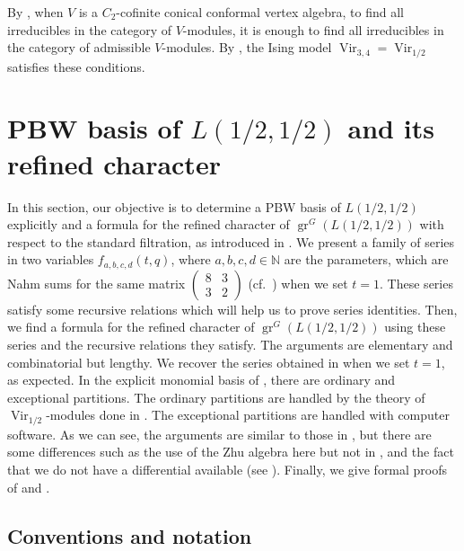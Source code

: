 \documentclass[a4paper, 12pt, reqno]{amsart}
\theoremstyle{remark}
\DeclareMathOperator{\Vir}{Vir}
\DeclareMathOperator{\gr}{gr}
\begin{document}
By , when $V$ is a $C_2$-cofinite conical conformal vertex algebra, to find all irreducibles in the category of $V$-modules, it is enough to find all irreducibles in the category of admissible $V$-modules.
By , the Ising model $\Vir_{3, 4} = \Vir_{1/2}$ satisfies these conditions.

\section{PBW basis of $L(1/2, 1/2)$ and its refined character}
\label{sec:pbw-basis-l12}

In this section, our objective is to determine a PBW basis of $L(1/2, 1/2)$ explicitly and a formula for the refined character of $\gr^G(L(1/2, 1/2))$ with respect to the standard filtration, as introduced in .
We present a family of series in two variables $f_{a, b, c, d}(t, q)$, where $a, b, c, d \in \mathbb{N}$ are the parameters, which are Nahm sums for the same matrix $\left(\begin{smallmatrix} 8 & 3 \\ 3 & 2 \end{smallmatrix}\right)$ (cf.\ \cite{Nahm2007}) when we set $t = 1$.
These series satisfy some recursive relations which will help us to prove series identities.
Then, we find a formula for the refined character of $\gr^G(L(1/2, 1/2))$ using these series and the recursive relations they satisfy.
The arguments are elementary and combinatorial but lengthy.
We recover the series obtained in \cite[Theorem 4]{andrews_singular_2022} when we set $t = 1$, as expected.
In the explicit monomial basis of , there are ordinary and exceptional partitions.
The ordinary partitions are handled by the theory of $\Vir_{1/2}$-modules done in .
The exceptional partitions are handled with computer software.
As we can see, the arguments are similar to those in \cite{andrews_singular_2022}, but there are some differences such as the use of the Zhu algebra here but not in \cite{andrews_singular_2022}, and the fact that we do not have a differential available (see ).
Finally, we give formal proofs of  and .

\subsection{Conventions and notation}
\label{sec:conventions-notation}
\end{document}
